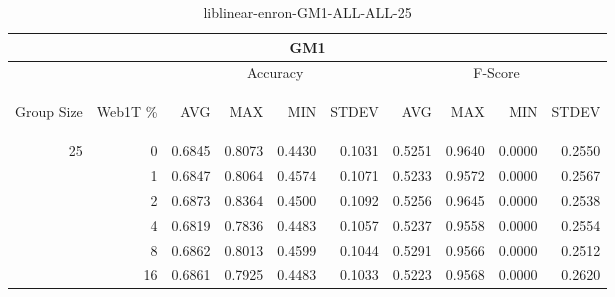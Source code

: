 \begin{center}
\begin{table}[htbp] 
 \begin{center}
\begin{tabular}{ | r | r | r | r | r | r | r | r | r | r |}
\hline
\multicolumn{10}{|c|}{GM1}\\
\hline
 & & \multicolumn{4}{|c|}{Accuracy} & \multicolumn{4}{|c|}{F-Score}\\ \cline{3-10}
\begin{sideways}Group Size\end{sideways} & \begin{sideways}Web1T \%\end{sideways} & \begin{sideways}AVG\end{sideways} & \begin{sideways}MAX\end{sideways} & \begin{sideways}MIN\end{sideways} & \begin{sideways}STDEV\end{sideways} & \begin{sideways}AVG\end{sideways} & \begin{sideways}MAX\end{sideways} & \begin{sideways}MIN\end{sideways} & \begin{sideways}STDEV\end{sideways}\\
\hline
\multirow{5}{*}{25}
 & 0 & 0.6845 & 0.8073 & 0.4430 & 0.1031 & 0.5251 & 0.9640 & 0.0000 & 0.2550\\ \cline{2-10}
 & 1 & 0.6847 & 0.8064 & 0.4574 & 0.1071 & 0.5233 & 0.9572 & 0.0000 & 0.2567\\ \cline{2-10}
 & 2 & 0.6873 & 0.8364 & 0.4500 & 0.1092 & 0.5256 & 0.9645 & 0.0000 & 0.2538\\ \cline{2-10}
 & 4 & 0.6819 & 0.7836 & 0.4483 & 0.1057 & 0.5237 & 0.9558 & 0.0000 & 0.2554\\ \cline{2-10}
 & 8 & 0.6862 & 0.8013 & 0.4599 & 0.1044 & 0.5291 & 0.9566 & 0.0000 & 0.2512\\ \cline{2-10}
 & 16 & 0.6861 & 0.7925 & 0.4483 & 0.1033 & 0.5223 & 0.9568 & 0.0000 & 0.2620\\ \cline{2-10}
\hline
\end{tabular}
\caption{liblinear-enron-GM1-ALL-ALL-25}
\label{table:liblinear-enron-GM1-ALL-ALL-25}
\end{center}
 \end{table}
\end{center}

